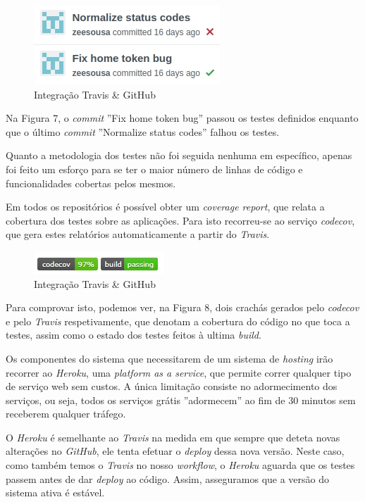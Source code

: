 \begin{figure}[H]
  \centering
        \includegraphics[scale=0.65]{img/github.jpg}
  \caption{Integração Travis \& GitHub}
\end{figure}

Na Figura 7, o \textit{commit} ''Fix home token bug'' passou os testes definidos enquanto que o último \textit{commit} ''Normalize status codes'' falhou os testes.

Quanto a metodologia dos testes não foi seguida nenhuma em específico, apenas foi feito um esforço para se ter o maior número de linhas de código e funcionalidades cobertas pelos mesmos.

Em todos os repositórios é possível obter um \textit{coverage report}, que relata a cobertura dos testes sobre as aplicações. Para isto recorreu-se ao serviço \textit{codecov}, que gera estes relatórios automaticamente a partir do \textit{Travis}.

\begin{figure}[H]
  \centering
        \includegraphics[scale=0.65]{img/github-badges.jpg}
  \caption{Integração Travis \& GitHub}
\end{figure}

Para comprovar isto, podemos ver, na Figura 8, dois crachás gerados pelo \textit{codecov} e pelo \textit{Travis} respetivamente, que denotam a cobertura do código no que toca a testes, assim como o estado dos testes feitos à ultima \textit{build}.

Os componentes do sistema que necessitarem de um sistema de \textit{hosting} irão recorrer ao \textit{Heroku}, uma \textit{platform as a service}, que permite correr qualquer tipo de serviço web sem custos. A única limitação consiste no adormecimento dos serviços, ou seja, todos os serviços grátis ''adormecem'' ao fim de 30 minutos sem receberem qualquer tráfego.

O \textit{Heroku} é semelhante ao \textit{Travis} na medida em que sempre que deteta novas alterações no \textit{GitHub}, ele tenta efetuar o \textit{deploy} dessa nova versão. Neste caso, como também temos o \textit{Travis} no nosso \textit{workflow}, o \textit{Heroku} aguarda que os testes passem antes de dar \textit{deploy} ao código. Assim, asseguramos que a versão do sistema ativa é estável.

